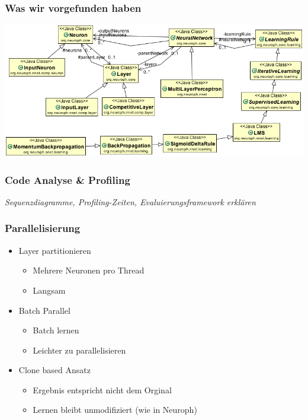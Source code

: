 \documentclass[18pt]{beamer}
\begin{document}
	\begin{frame}[c]\frametitle{Was wir vorgefunden haben}		
		\includegraphics[scale=0.4]{Klassendiagramm.png}
	\end{frame}


	\begin{frame}[c]\frametitle{Code Analyse \& Profiling}
		\begin{block}{}
			\begin{center}
			\textit{Sequenzdiagramme, Profiling-Zeiten, Evaluierungsframework erklären}
			\end{center}
		\end{block}
	\end {frame}
	
	\begin{frame}[c]\frametitle{Parallelisierung}
		\begin{itemize}
			\item Layer partitionieren
			\begin{itemize}
				\item Mehrere Neuronen pro Thread
				\item Langsam
			\end{itemize}
			\item Batch Parallel
			\begin{itemize}
				\item Batch lernen
				\item Leichter zu parallelisieren
			\end{itemize}
			\item Clone based Ansatz
			\begin{itemize}
				\item Ergebnis entspricht nicht dem Orginal
				\item Lernen bleibt unmodifiziert (wie in Neuroph) %
			\end{itemize}
		\end{itemize}	
	\end{frame}
\end{document}
